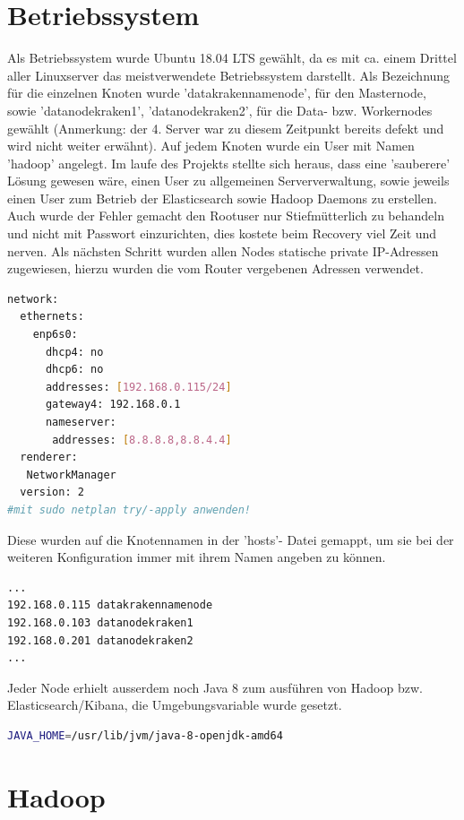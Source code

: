 \documentclass[12pt,oneside,a4paper,parskip]{scrbook}
\begin{document}
\section{Betriebssystem} Als Betriebssystem wurde Ubuntu 18.04 LTS gewählt, da es mit ca. einem Drittel aller Linuxserver das meistverwendete Betriebssystem darstellt. Als Bezeichnung für die einzelnen Knoten wurde 'datakrakennamenode', für den Masternode, sowie 'datanodekraken1', 'datanodekraken2', für die Data- bzw. Workernodes gewählt (Anmerkung: der 4. Server war zu diesem Zeitpunkt bereits defekt und wird nicht weiter erwähnt). Auf jedem Knoten wurde ein User mit Namen 'hadoop' angelegt. Im laufe des Projekts stellte sich heraus, dass eine 'sauberere' Lösung gewesen wäre, einen User zu allgemeinen Serververwaltung, sowie jeweils einen User zum Betrieb der Elasticsearch sowie Hadoop Daemons zu erstellen. Auch wurde der Fehler gemacht den Rootuser nur Stiefmütterlich zu behandeln und nicht mit Passwort einzurichten, dies kostete beim Recovery viel Zeit und nerven.\newline
Als nächsten Schritt wurden allen Nodes statische private IP-Adressen zugewiesen, hierzu wurden die vom Router vergebenen Adressen verwendet. \pagebreak
\begin{lstlisting}[caption=datakrakennamenode: /etc/netplan/00-installer-config.yaml,label=hosts,language=bash]
network:
  ethernets:
    enp6s0:
      dhcp4: no
      dhcp6: no
      addresses: [192.168.0.115/24]
      gateway4: 192.168.0.1
      nameserver:
       addresses: [8.8.8.8,8.8.4.4]
  renderer:
   NetworkManager
  version: 2
#mit sudo netplan try/-apply anwenden!
\end{lstlisting}
Diese wurden auf die Knotennamen in der 'hosts'- Datei gemappt, um sie bei der weiteren Konfiguration immer mit ihrem Namen angeben zu können.
\begin{lstlisting}[caption=etc/hosts,label=hosts,language=bash]
...
192.168.0.115 datakrakennamenode
192.168.0.103 datanodekraken1
192.168.0.201 datanodekraken2
...
\end{lstlisting}
Jeder Node erhielt ausserdem noch Java 8 zum ausführen von Hadoop bzw. Elasticsearch/Kibana, die Umgebungsvariable wurde gesetzt.
\begin{lstlisting}[caption=etc/environment,label=javaenv,language=bash]
JAVA_HOME=/usr/lib/jvm/java-8-openjdk-amd64
\end{lstlisting}

\pagebreak

\section{Hadoop}
\end{document}
